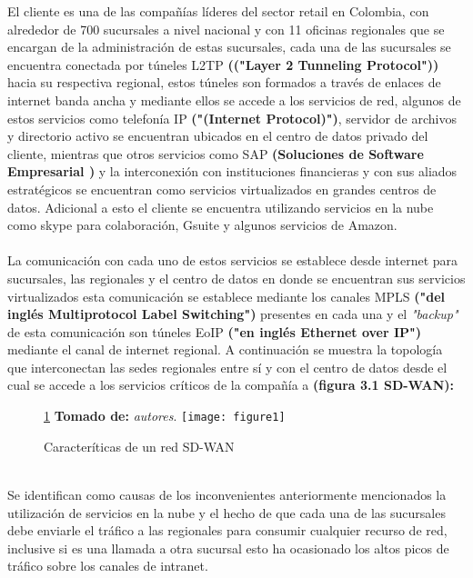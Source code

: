 El cliente es una de las compañías líderes del sector retail en Colombia, con alrededor de 700 sucursales a nivel nacional y con 11 oficinas regionales que se encargan de la administración de estas sucursales, cada una de las sucursales se encuentra  conectada por túneles L2TP \textbf{(("Layer 2 Tunneling Protocol"))} hacia su respectiva regional, estos túneles son formados a través de enlaces de internet banda ancha y mediante ellos se accede a los servicios de red, algunos de estos servicios como telefonía IP \textbf{("(Internet Protocol)")}, servidor de archivos y directorio activo se encuentran ubicados en el centro de datos privado del cliente, mientras que otros servicios como SAP \textbf{(Soluciones de Software Empresarial )} y la interconexión con instituciones financieras y con sus aliados estratégicos se encuentran como servicios virtualizados en grandes centros de datos. Adicional a esto el cliente se encuentra utilizando servicios en la nube como skype para colaboración, Gsuite y algunos servicios de Amazon.
\\
\\
La comunicación con cada uno de estos servicios se establece desde internet para sucursales, las regionales y el centro de datos en donde se encuentran sus servicios virtualizados esta comunicación se establece mediante los canales MPLS \textbf{("del inglés Multiprotocol Label Switching")} presentes en cada una y el \textit{"backup"} de esta comunicación son túneles EoIP \textbf{("en inglés Ethernet over IP")} mediante el canal de internet regional. A continuación se muestra la topología que interconectan las sedes regionales entre sí y con el centro de datos desde el cual se accede a los servicios críticos de la compañía a \textbf{(figura 3.1 SD-WAN):}
\begin{figure}[htbp]
 \ref{fig:sd-wan} \textbf{Tomado de:} \textit{autores}.
   \centering
    {\texttt{[image: figure1]}}%
  \caption{Caracteríticas de un red SD-WAN}
  \label{fig:sd-wan}
\end{figure}
\\
Se identifican como causas de los inconvenientes anteriormente mencionados la utilización de servicios en la nube y el hecho de que cada una de las sucursales debe enviarle el tráfico a las regionales para consumir cualquier recurso de red, inclusive si es una llamada a otra sucursal esto ha ocasionado los altos picos de tráfico sobre los canales de intranet.
